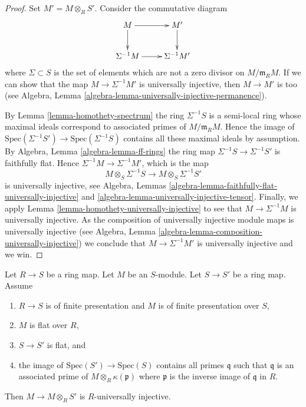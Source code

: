 \begin{proof}
Set $M' = M \otimes_R S'$. Consider the commutative diagram
$$
\xymatrix{
M \ar[d] \ar[r] & M' \ar[d] \\
\Sigma^{-1}M \ar[r] & \Sigma^{-1}M'
}
$$
where $\Sigma \subset S$ is the set of elements which are not a
zero divisor on $M/\mathfrak m_R M$. If we can show that the map
$M \to \Sigma^{-1}M'$ is universally injective, then $M \to M'$
is too (see
Algebra, Lemma \ref{algebra-lemma-universally-injective-permanence}).

\medskip\noindent
By
Lemma \ref{lemma-homothety-spectrum}
the ring $\Sigma^{-1}S$ is a semi-local ring whose maximal ideals
correspond to associated primes of $M/\mathfrak m_R M$.
Hence the image of
$\text{Spec}(\Sigma^{-1}S') \to \text{Spec}(\Sigma^{-1}S)$
contains all these maximal ideals by assumption. By
Algebra, Lemma \ref{algebra-lemma-ff-rings}
the ring map $\Sigma^{-1}S \to \Sigma^{-1}S'$ is faithfully flat.
Hence $\Sigma^{-1}M \to \Sigma^{-1}M'$, which is the map
$$
M \otimes_S \Sigma^{-1}S \longrightarrow M \otimes_S \Sigma^{-1}S'
$$
is universally injective, see
Algebra, Lemmas \ref{algebra-lemma-faithfully-flat-universally-injective} and
\ref{algebra-lemma-universally-injective-tensor}.
Finally, we apply
Lemma \ref{lemma-homothety-universally-injective}
to see that $M \to \Sigma^{-1}M$ is universally injective.
As the composition of universally injective module maps is universally
injective (see
Algebra, Lemma \ref{algebra-lemma-composition-universally-injective})
we conclude that $M \to \Sigma^{-1}M'$ is universally injective and we win.
\end{proof}

\begin{lemma}
\label{lemma-base-change-universally-flat}
Let $R \to S$ be a ring map.
Let $M$ be an $S$-module.
Let $S \to S'$ be a ring map.
Assume
\begin{enumerate}
\item $R \to S$ is of finite presentation and $M$ is of finite presentation
over $S$,
\item $M$ is flat over $R$,
\item $S \to S'$ is flat, and
\item the image of $\text{Spec}(S') \to \text{Spec}(S)$ contains
all primes $\mathfrak q$ such that $\mathfrak q$ is an associated prime
of $M \otimes_R \kappa(\mathfrak p)$ where $\mathfrak p$ is the inverse
image of $\mathfrak q$ in $R$.
\end{enumerate}
Then $M \to M \otimes_R S'$ is $R$-universally injective.
\end{lemma}

